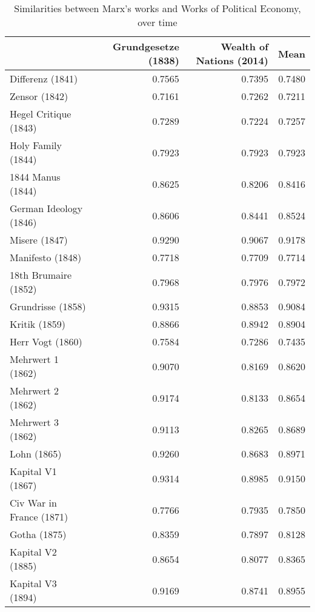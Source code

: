 \begin{table}
\centering
\caption{Similarities between Marx's works and Works of Political Economy, over time}
\label{tab:pesims}
\begin{tabular}{lrrr}
\toprule
{} &  Grundgesetze (1838) &  Wealth of Nations (2014) &   Mean \\
\midrule
Differenz (1841)         &               0.7565 &                    0.7395 & 0.7480 \\
Zensor (1842)            &               0.7161 &                    0.7262 & 0.7211 \\
Hegel Critique (1843)    &               0.7289 &                    0.7224 & 0.7257 \\
Holy Family (1844)       &               0.7923 &                    0.7923 & 0.7923 \\
1844 Manus (1844)        &               0.8625 &                    0.8206 & 0.8416 \\
German Ideology (1846)   &               0.8606 &                    0.8441 & 0.8524 \\
Misere (1847)            &               0.9290 &                    0.9067 & 0.9178 \\
Manifesto (1848)         &               0.7718 &                    0.7709 & 0.7714 \\
18th Brumaire (1852)     &               0.7968 &                    0.7976 & 0.7972 \\
Grundrisse (1858)        &               0.9315 &                    0.8853 & 0.9084 \\
Kritik (1859)            &               0.8866 &                    0.8942 & 0.8904 \\
Herr Vogt (1860)         &               0.7584 &                    0.7286 & 0.7435 \\
Mehrwert 1 (1862)        &               0.9070 &                    0.8169 & 0.8620 \\
Mehrwert 2 (1862)        &               0.9174 &                    0.8133 & 0.8654 \\
Mehrwert 3 (1862)        &               0.9113 &                    0.8265 & 0.8689 \\
Lohn (1865)              &               0.9260 &                    0.8683 & 0.8971 \\
Kapital V1 (1867)        &               0.9314 &                    0.8985 & 0.9150 \\
Civ War in France (1871) &               0.7766 &                    0.7935 & 0.7850 \\
Gotha (1875)             &               0.8359 &                    0.7897 & 0.8128 \\
Kapital V2 (1885)        &               0.8654 &                    0.8077 & 0.8365 \\
Kapital V3 (1894)        &               0.9169 &                    0.8741 & 0.8955 \\
\bottomrule
\end{tabular}
\end{table}
